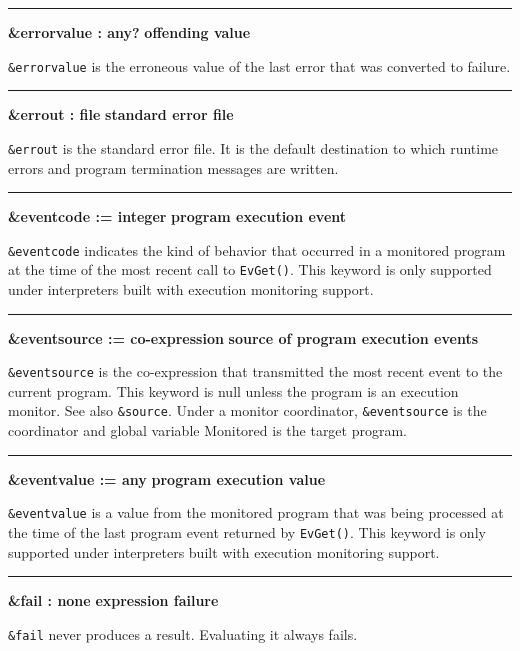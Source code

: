 \bigskip\hrule\vspace{0.1cm}
\noindent
{\bf \&errorvalue : any? } \hfill {\bf offending value}

\noindent
\texttt{\&errorvalue} is the erroneous value of the last error that was
converted to failure.

\bigskip\hrule\vspace{0.1cm}
\noindent
{\bf \&errout : file } \hfill {\bf standard error file}

\noindent
{}\texttt{\&errout} is the standard
error file. It is the default destination to which runtime errors and
program termination messages are written.

\bigskip\hrule\vspace{0.1cm}
\noindent
{\bf \&eventcode := integer } \hfill {\bf program execution event}

\noindent
{}\texttt{\&eventcode} indicates the
kind of behavior that occurred in a monitored program at the time of
the most recent call to \texttt{EvGet()}. This keyword is only
supported under interpreters built with execution monitoring support.

\bigskip\hrule\vspace{0.1cm}
\noindent
{\bf \&eventsource := co{}-expression } \hfill {\bf source of program execution events}

\noindent
\texttt{\&eventsource} is the co-expression that transmitted the most
recent event to the current program. This keyword is null unless the
program is an execution monitor. See also \texttt{\&source}. Under a
monitor coordinator, \texttt{\&eventsource} is the coordinator and
global variable Monitored is the target program.

\bigskip\hrule\vspace{0.1cm}
\noindent
{\bf \&eventvalue := any } \hfill {\bf program execution value}

\noindent
{}\texttt{\&eventvalue} is a value
from the monitored program that was being processed at the time of the
last program event returned by \texttt{EvGet()}. This keyword is only
supported under interpreters built with execution monitoring support.

\bigskip\hrule\vspace{0.1cm}
\noindent
{\bf \&fail : none } \hfill {\bf expression failure}

\noindent
{}\texttt{\&fail} never produces a
result. Evaluating it always fails.

